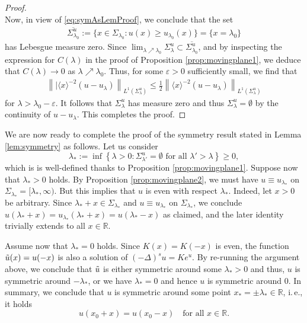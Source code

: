 \documentclass[reqno,10pt,a4paper]{amsart}
\theoremstyle{definition}
\theoremstyle{definition}
\theoremstyle{remark}
\theoremstyle{remark}
\numberwithin{equation}{section}
\newcommand{\R}{\mathbb{R}}
\newcommand{\eps}{\varepsilon}
\begin{document}
\begin{appendix}
\begin{proof}
$$    $$
    Now, in view of \eqref{eq:symAsLemProof}, we conclude that the set \begin{align*}
        \overline{\Sigma_{\lambda_0}^u} := \{x \in \Sigma_{\lambda_0} : u(x) \geq u_{\lambda_0}(x)\} = \{x= \lambda_0\}
    \end{align*}
    has Lebesgue measure zero. Since $\lim_{\lambda \nearrow \lambda_0} \Sigma_\lambda^u \subset \overline{\Sigma_{\lambda_0}^u}$, and by inspecting the expression for $C(\lambda)$ in the proof of Proposition \ref{prop:movingplane1}, we deduce that $C(\lambda) \rightarrow 0$ as $\lambda \nearrow \lambda_0$. Thus, for some $\eps> 0$ sufficiently small, we find that 
    \begin{align*}
        \left \| |\langle x\rangle^{-2}(u-u_\lambda)\right \|_{L^1(\Sigma_\lambda^u)} \leq \frac{1}{2} \left \|\langle x\rangle^{-2}(u-u_\lambda)\right \|_{L^1(\Sigma_\lambda^u)}
    \end{align*}
    for $\lambda > \lambda_0 - \eps$. It follows that $\Sigma_\lambda^u$ has measure zero and thus $\Sigma_\lambda^u = \emptyset$ by the continuity of $u-u_\lambda$. This completes the proof.
\end{proof}


We are now ready to complete the proof of the symmetry result stated in Lemma \ref{lem:symmetry} as follows. Let us consider 
\begin{equation*}
        \lambda_* := \inf\left\{\lambda>0 : \Sigma_{\lambda'}^u = \emptyset \text{ for all } \lambda' > \lambda \right\} \geq 0,
    \end{equation*}
     which is is well-defined thanks to Proposition \ref{prop:movingplane1}. Suppose now that $\lambda_* > 0$ holds. By Proposition \ref{prop:movingplane2}, we must have $u \equiv u_{\lambda_*}$ on $\Sigma_{\lambda_*}= [\lambda_*, \infty)$. But this implies that $u$ is even with respect $\lambda_*$. Indeed, let $x > 0$ be arbitrary. Since $\lambda_* + x \in  \Sigma_{\lambda_*}$ and $u \equiv u_{\lambda_*}$ on $\Sigma_{\lambda_*}$, we conclude $u(\lambda_*+x) = u_{\lambda_*}(\lambda_*+x) = u(\lambda_*-x)$ as claimed, and the later identity trivially extends to all $x \in \R$. 
     
     Assume now that $\lambda_* = 0$ holds. Since $K(x) = K(-x)$ is even, the function $\Tilde{u}(x) = u(-x)$ is also a solution of $(-\Delta)^s u = K e^u$. By re-running the argument above, we conclude that $\Tilde{u}$ is either symmetric around some $\lambda_*>0$ and thus, $u$ is symmetric around $-\lambda_*$, or we have $\lambda_*=0$ and hence $u$ is symmetric around $0$. In summary, we conclude that $u$ is symmetric around some point $x_* = \pm \lambda_* \in \mathbb{R}$, i.\,e., it holds
    $$
    u(x_0+x) = u(x_0-x) \quad \mbox{for all $x \in \R$}.
    $$  
    

\end{appendix}
\end{document}
